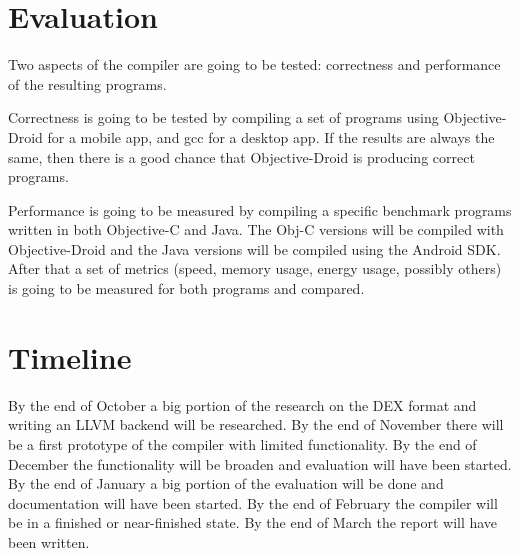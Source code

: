 \documentclass[a4paper,11pt]{article}
\begin{document}
\section{Evaluation}
Two aspects of the compiler are going to be tested: correctness and
performance of the resulting programs.

Correctness is going to be tested by compiling a set of programs using
Objective-Droid for a mobile app, and gcc for a desktop app. If the results are
always the same, then there is a good chance that Objective-Droid is
producing correct programs.

Performance is going to be measured by compiling a specific benchmark programs
written in both Objective-C and Java. The Obj-C versions will be compiled
with Objective-Droid and the Java versions will be compiled using the Android
SDK. After that a set of metrics (speed, memory usage, energy usage, possibly
others) is going to be measured for both programs and compared.
\section{Timeline}
By the end of October a big portion of the research on the DEX format and
writing an LLVM backend will be researched. By the end of November there will
be a first prototype of the compiler with limited functionality. By the end of
December the functionality will be broaden and evaluation will have been
started. By the end of January a big portion of the evaluation will be done
and documentation will have been started. By the end of February the compiler
will be in a finished or near-finished state. By the end of March the report
will have been written.
\end{document}
